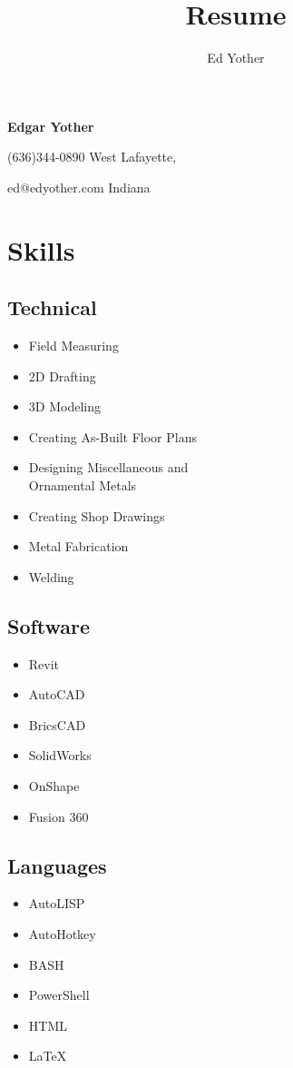 \documentclass[9pt]{extarticle}
\title{Resume}
\author{Ed Yother}
\begin{document}
\titleformat{\section}{\large\bfseries}{\thesection}{1em}{\hrule}

\begin{huge}
\begin{center}
    \textbf{Edgar Yother}
\end{center}

(636)344-0890 \hfill West Lafayette, 

ed@edyother.com \hfill  Indiana 
\end{huge}

\section*{Skills}

\begin{multicols}{3}
\subsection*{Technical}
\begin{itemize}
    \item Field Measuring  
    \item 2D Drafting
    \item 3D Modeling
    \item Creating As-Built Floor Plans
    \item Designing Miscellaneous and \\
        Ornamental Metals 
    \item Creating Shop Drawings
    \item Metal Fabrication  
    \item Welding  
\end{itemize}
\columnbreak
\subsection*{Software}
\begin{itemize}
    \item Revit
    \item AutoCAD  
    \item BricsCAD
    \item SolidWorks  
    \item OnShape
    \item Fusion 360
\end{itemize}
\columnbreak
\subsection*{Languages}
\begin{itemize}
    \item AutoLISP
    \item AutoHotkey
    \item BASH
    \item PowerShell
    \item HTML
    \item \LaTeX
\end{itemize}
\end{multicols}
\end{document}
